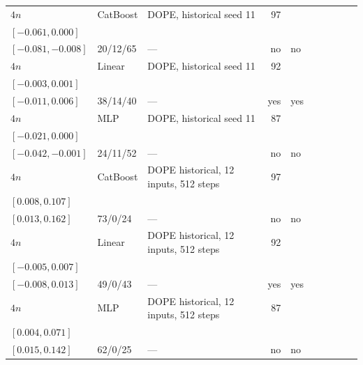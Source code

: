 \begin{longtable}{@{}ll>{\raggedright\arraybackslash}p{1.1in}rllrlll@{}}
$4n$ & CatBoost & DOPE, historical seed 11 & 97 & \begin{tabular}[t]{@{}l@{}}$-0.028$\\\tiny$[-0.061, 0.000]$\end{tabular} & \begin{tabular}[t]{@{}l@{}}$-0.037$\\\tiny$[-0.081, -0.008]$\end{tabular} & 20/12/65 & --- & no & no \\
$4n$ & Linear & DOPE, historical seed 11 & 92 & \begin{tabular}[t]{@{}l@{}}$0.000$\\\tiny$[-0.003, 0.001]$\end{tabular} & \begin{tabular}[t]{@{}l@{}}$0.000$\\\tiny$[-0.011, 0.006]$\end{tabular} & 38/14/40 & --- & yes & yes \\
$4n$ & MLP & DOPE, historical seed 11 & 87 & \begin{tabular}[t]{@{}l@{}}$-0.012$\\\tiny$[-0.021, 0.000]$\end{tabular} & \begin{tabular}[t]{@{}l@{}}$-0.020$\\\tiny$[-0.042, -0.001]$\end{tabular} & 24/11/52 & --- & no & no \\
$4n$ & CatBoost & DOPE historical, 12 inputs, 512 steps & 97 & \begin{tabular}[t]{@{}l@{}}$0.036$\\\tiny$[0.008, 0.107]$\end{tabular} & \begin{tabular}[t]{@{}l@{}}$0.061$\\\tiny$[0.013, 0.162]$\end{tabular} & 73/0/24 & --- & no & no \\
$4n$ & Linear & DOPE historical, 12 inputs, 512 steps & 92 & \begin{tabular}[t]{@{}l@{}}$0.001$\\\tiny$[-0.005, 0.007]$\end{tabular} & \begin{tabular}[t]{@{}l@{}}$0.003$\\\tiny$[-0.008, 0.013]$\end{tabular} & 49/0/43 & --- & yes & yes \\
$4n$ & MLP & DOPE historical, 12 inputs, 512 steps & 87 & \begin{tabular}[t]{@{}l@{}}$0.025$\\\tiny$[0.004, 0.071]$\end{tabular} & \begin{tabular}[t]{@{}l@{}}$0.058$\\\tiny$[0.015, 0.142]$\end{tabular} & 62/0/25 & --- & no & no \\

\end{longtable}
